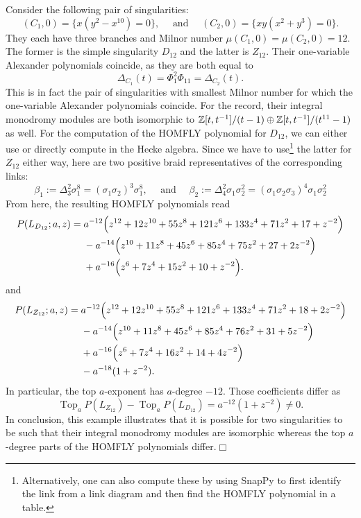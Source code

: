 \begin{example}\label{ex:singularity_pair_3} Consider the following pair of singularities:
$$(C_1,0)=\{x(y^2-x^{10})=0\},\quad\mbox{ and }\quad (C_2,0)=\{xy(x^2+y^3)=0\}.$$
\noindent They each have three branches and Milnor number $\mu(C_1,0)=\mu(C_2,0)=12$. The former is the simple singularity $D_{12}$ and the latter is $Z_{12}$. Their one-variable Alexander polynomials coincide, as they are both equal to
$$\Delta_{C_1}(t)=\Phi_{1}^{2}\Phi_{11}=\Delta_{C_2}(t).$$
This is in fact the pair of singularities with smallest Milnor number for which the one-variable Alexander polynomials coincide. For the record, their integral monodromy modules are both isomorphic to $\mathbb Z[t,t^{-1}]/(t-1)\oplus \mathbb Z[t,t^{-1}]/(t^{11}-1)$ as well. For the computation of the HOMFLY polynomial for $D_{12}$, we can either use \cite[Theorem~3.11]{Schwartz} or directly compute in the Hecke algebra. Since we have to use\footnote{Alternatively, one can also compute these by using SnapPy to first identify the link from a link diagram and then find the HOMFLY polynomial in a table.} the latter for $Z_{12}$ either way, here are two positive braid representatives of the corresponding links:
$$\beta_1:=\Delta_3^2\sigma_1^8=(\sigma_1\sigma_2)^3\sigma_1^8,\quad\mbox{ and }\quad \beta_2:=\Delta_4^2\sigma_1\sigma_2^2
       =(\sigma_1\sigma_2\sigma_3)^4\sigma_1\sigma_2^2$$
From here, the resulting HOMFLY polynomials read
\begin{align}\label{eq:fullD}
P(L_{D_{12}};a,z)
={}&
 a^{-12}\Bigl(
 z^{12}+12z^{10}+55z^8+121z^6+133z^4
 +71z^2+17+z^{-2}
 \Bigr)
\notag\\
&-a^{-14}\Bigl(
 z^{10}+11z^8+45z^6+85z^4
 +75z^2+27+2z^{-2}
 \Bigr)
\notag\\
&+a^{-16}\Bigl(
 z^6+7z^4+15z^2+10+z^{-2}
 \Bigr).
\end{align}
and\\
\begin{align}\label{eq:fullZ}
P(L_{Z_{12}};a,z)
={}&
 a^{-12}\Bigl(
 z^{12}+12z^{10}+55z^8+121z^6+133z^4
 +71z^2+18+2z^{-2}
 \Bigr)
\notag\\
&-a^{-14}\Bigl(
 z^{10}+11z^8+45z^6+85z^4
 +76z^2+31+5z^{-2}
 \Bigr)
\notag\\
&+a^{-16}\Bigl(
 z^6+7z^4+16z^2+14+4z^{-2}
 \Bigr)
\notag\\
&-a^{-18}(1+z^{-2}).
\end{align}
In particular, the top $a$-exponent has $a$-degree $-12$. Those coefficients differ as
\[
\boxed{
\operatorname{Top}_aP(L_{Z_{12}})-\operatorname{Top}_aP(L_{D_{12}})
=a^{-12}(1+z^{-2})\neq0.
}
\]
\noindent In conclusion, this example illustrates that it is possible for two singularities to be such that their integral monodromy modules are isomorphic whereas the top $a$-degree parts of the HOMFLY polynomials differ.\hfill$\Box$
\end{example}

